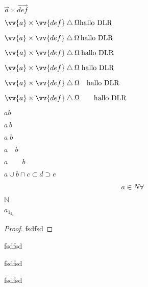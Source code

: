\documentclass[12pt,ngerman,parskip=half]{scrartcl}
\begin{document}
\( \vec{a} \times \vec{def} \)

\( \vv{a} \times \vv{def} \bigtriangleup \Omega\text{hallo DLR} \)

\( \vv{a} \times \vv{def} \bigtriangleup \Omega \, \text{hallo DLR} \)

\( \vv{a} \times \vv{def} \bigtriangleup \Omega \: \text{hallo DLR} \)

\( \vv{a} \times \vv{def} \bigtriangleup \Omega \; \text{hallo DLR} \)

\( \vv{a} \times \vv{def} \bigtriangleup \Omega \quad \text{hallo DLR} \)

\( \vv{a} \times \vv{def} \bigtriangleup \Omega \qquad \textrm{hallo DLR} \)



\clearpage

\( ab \) %

\(a\,b \)

\(a\;b\)

\(a\quad b\)

\(a\qquad b\)

\(a \cup b \cap  c \subset d \supset e \)

\[ a \in N \forall  \]

\(  \mathbb{N} \)


\(  a_{1_{2_{3_4}}}   \) 


\begin{proof}
fsdfsd
\end{proof}

\begin{theorem}
fsdfsd
\end{theorem}

\begin{lemma}
fsdfsd
\end{lemma}

\begin{corollary}
fsdfsd
\end{corollary}
\end{document}
